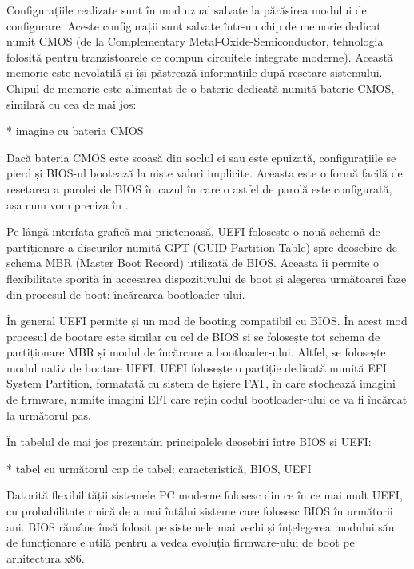 Configurațiile realizate sunt în mod uzual salvate la părăsirea modului de
configurare. Aceste configurații sunt salvate într-un chip de memorie dedicat
numit CMOS  (de la
Complementary Metal-Oxide-Semiconductor, tehnologia folosită pentru
tranzistoarele ce compun circuitele integrate moderne). Această memorie este
nevolatilă și își păstrează informațiile după resetare sistemului. Chipul de
memorie este alimentat de o baterie dedicată numită baterie CMOS, similară cu
cea de mai jos:

* imagine cu bateria CMOS

Dacă bateria CMOS este scoasă din soclul ei sau este epuizată, configurațiile se
pierd și BIOS-ul bootează la niște valori implicite. Aceasta este o formă facilă
de resetarea a parolei de BIOS în cazul în care o astfel de parolă este
configurată, așa cum vom preciza în .

Pe lângă interfața grafică mai prietenoasă, UEFI folosește o nouă schemă de
partiționare a discurilor numită GPT  (GUID
Partition Table) spre deosebire de schema MBR 
(Master Boot Record) utilizată de BIOS. Aceasta îi permite o flexibilitate
sporită în accesarea dispozitivului de boot și alegerea următoarei faze din
procesul de boot: încărcarea bootloader-ului.

În general UEFI permite și un mod de booting compatibil cu BIOS. În acest mod
procesul de bootare este similar cu cel de BIOS și se folosește tot schema de
partiționare MBR și modul de încărcare a bootloader-ului. Altfel, se folosește
modul nativ de bootare UEFI. UEFI folosește o partiție dedicată numită EFI
System Partition, formatată cu sistem de fișiere FAT, în care stochează imagini
de firmware, numite imagini EFI care rețin codul bootloader-ului ce va fi
încărcat la următorul pas.

În tabelul de mai jos prezentăm principalele deosebiri între BIOS și UEFI:

* tabel cu următorul cap de tabel: caracteristică, BIOS, UEFI

Datorită flexibilității sistemele PC  moderne
folosesc din ce în ce mai mult UEFI, cu probabilitate rmică de a mai întâlni
sisteme care folosesc BIOS în următorii ani. BIOS rămâne însă folosit pe
sistemele mai vechi și înțelegerea modului său de funcționare e utilă pentru a
vedea evoluția firmware-ului de boot pe arhitectura x86.

